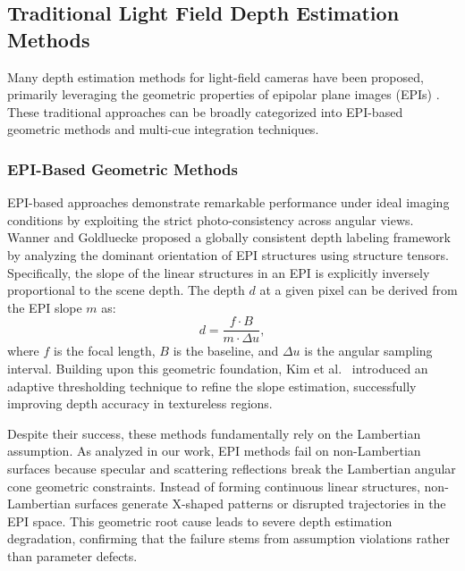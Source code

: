 \subsection{Traditional Light Field Depth Estimation Methods}

Many depth estimation methods for light-field cameras have been proposed, primarily leveraging the geometric properties of epipolar plane images (EPIs) \cite{bolles1987epipolar, wanner2012globally}. These traditional approaches can be broadly categorized into EPI-based geometric methods and multi-cue integration techniques.

\subsubsection{EPI-Based Geometric Methods}
EPI-based approaches demonstrate remarkable performance under ideal imaging conditions by exploiting the strict photo-consistency across angular views. Wanner and Goldluecke \cite{wanner2012globally} proposed a globally consistent depth labeling framework by analyzing the dominant orientation of EPI structures using structure tensors. Specifically, the slope of the linear structures in an EPI is explicitly inversely proportional to the scene depth. The depth $d$ at a given pixel can be derived from the EPI slope $m$ as:
\begin{equation}
d = \frac{f \cdot B}{m \cdot \Delta u},
\label{eq:ch2_1}
\end{equation}
where $f$ is the focal length, $B$ is the baseline, and $\Delta u$ is the angular sampling interval. Building upon this geometric foundation, Kim et al.\ \cite{kim2013adaptive} introduced an adaptive thresholding technique to refine the slope estimation, successfully improving depth accuracy in textureless regions. 

Despite their success, these methods fundamentally rely on the Lambertian assumption. As analyzed in our work, EPI methods fail on non-Lambertian surfaces because specular and scattering reflections break the Lambertian angular cone geometric constraints. Instead of forming continuous linear structures, non-Lambertian surfaces generate X-shaped patterns or disrupted trajectories in the EPI space. This geometric root cause leads to severe depth estimation degradation, confirming that the failure stems from assumption violations rather than parameter defects.

